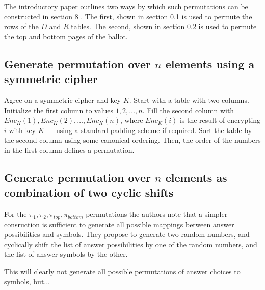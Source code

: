 The introductory paper outlines two ways by which such permutations can be
constructed in section 8 \autocite{fisherPunchscanIntroductionSystem2006}. The
first, shown in section \ref{sec:permutations_via_symmetric_cipher} is used to
permute the rows of the $D$ and $R$ tables. The second, shown in section
\ref{sec:permutations_via_shifts} is used to permute the top and bottom pages
of the ballot.

\subsection{Generate permutation over $n$ elements using a symmetric cipher}
\label{sec:permutations_via_symmetric_cipher}

Agree on a symmetric cipher and key $K$. Start with a table with two columns.
Initialize the first column to values $1, 2, \ldots, n$. Fill the second column
with $Enc_K(1), Enc_K(2), \ldots, Enc_K(n)$, where $Enc_K(i)$ is the result of
encrypting $i$ with key $K$ --- using a standard padding scheme if required.
Sort the table by the second column using some canonical ordering. Then, the
order of the numbers in the first column defines a permutation.

\subsection{Generate permutation over $n$ elements as combination of two cyclic shifts}
\label{sec:permutations_via_shifts}

For the $\pi_1, \pi_2, \pi_{top}, \pi_{bottom}$ permutations the authors note
that a simpler consruction is sufficient to generate all possible mappings
between answer possibilities and symbols. They propose to generate two random
numbers, and cyclically shift the list of answer possibilities by one of the
random numbers, and the list of answer symbols by the other.

This will clearly not generate all possible permutations of answer choices to symbols, but...


